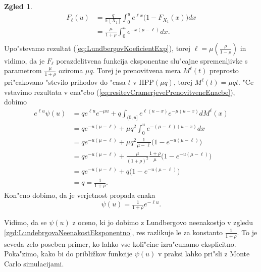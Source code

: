 \documentclass[12pt, a4paper, reqno]{amsart}
\theoremstyle{definition}
\newtheorem{zgled}[definicija]{Zgled}
\theoremstyle{plain}
\newcommand{\E}{\mathbb{E}}
\newcommand{\1}{\mathds{1}}
\begin{document}
\begin{zgled}
                \begin{align*}
                    F_\ell(u)  &= \frac{q}{\E\left[X_1\right]}\int_0^ue^{\ell x}\bigl(1 - F_{X_1}(x)\bigr)dx \\
                            &= \frac{\mu}{1 + \rho}\int_0^ue^{-x(\mu - \ell)}dx. \\
                \end{align*}
                Upo"stevamo rezultat (\ref{eq:LundbergovKoeficientExp}), torej 
                $\ell = \mu\left(\tfrac{\rho}{1 - \rho}\right)$ in vidimo, da je $F_\ell$ porazdelitvena 
                funkcija eksponentne slu"cajne spremenljivke s parametrom $\frac{\mu}{1 + \rho}$ oziroma 
                $\mu q$. Torej je prenovitvena mera $M^\ell(t)$ preprosto pri"cakovano "stevilo prihodov do 
                "casa $t$ v $\text{HPP}(\mu q)$, torej $M^\ell(t) = \mu qt$.
                "Ce vstavimo rezultata v ena"cbo (\ref{eq:resitevCramerjevePrenovitveneEnacbe}), dobimo
                \begin{align*}
                    e^{\ell u}\psi(u)   &= qe^{\ell u}e^{-\mu u} + q\int_{(0, u]}e^{\ell(u - x)}e^{-\mu(u - x)}dM^\ell(x)\\
                                        &= qe^{-u(\mu - \ell)} + \mu q^2\int_0^u e^{-(\mu - \ell)(u - x)}dx \\
                                        &= qe^{-u(\mu - \ell)} + \mu q^2 \frac{1}{\mu - \ell}\biggl(1 - e^{-u(\mu - \ell)}\biggr)\\
                                        &= qe^{-u(\mu - \ell)} + \frac{\mu}{(1 + \rho)^2}\frac{1 + \rho}{\mu}\biggl(1 - e^{-u(\mu - \ell)}\biggr) \\
                                        &= qe^{-u(\mu - \ell)} + q\biggl(1 - e^{-u(\mu - \ell)}\biggr) \\
                                        &= q = \frac{1}{1 + \rho}.
                \end{align*}
                Kon"cno dobimo, da je verjetnost propada enaka
                \begin{equation}
                    \psi(u) =  \tfrac{1}{1+\rho}e^{-\ell u}.
                \label{eq:eksplicitnaVerjetnostPropadaExp}
                \end{equation}
            \end{zgled}

                Vidimo, da se $\psi(u)$ z oceno, ki jo dobimo z Lundbergovo neenakostjo v zgledu \ref{zgd:LundebrgovaNeenakostEksponentno}, 
                res razlikuje le za konstanto $\tfrac{1}{1 + \rho}$.
                To je seveda zelo poseben primer, ko lahko vse koli"cine izra"cunamo eksplicitno.
                Poka"zimo, kako bi do približkov funkcije $\psi(u)$ v praksi lahko pri"sli z Monte 
                Carlo simulacijami.
            
\end{document}
